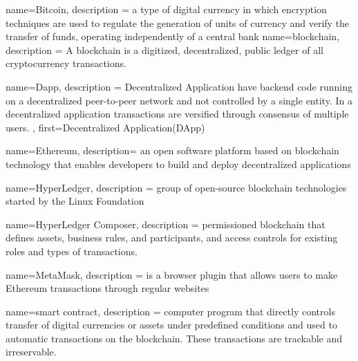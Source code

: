 {
	name={Bitcoin},
	description ={
		a type of digital currency in which encryption techniques are used to regulate the generation of units of currency and verify the transfer of funds, operating independently of a central bank
	}
}
{
	name={blockchain},
	description ={
		A blockchain is a digitized, decentralized, public ledger of all cryptocurrency transactions. 
	}
}


{
	name={Dapp},
	description ={
		Decentralized Application have backend code running on a decentralized peer-to-peer network and not controlled by a single entity. In a decentralized application transactions are versified through consensus of multiple users.
	},
	first={Decentralized Application(DApp)}
}


{
	name={Ethereum},
	description={
		an open software platform based on blockchain technology that enables developers to build and deploy decentralized applications
	}
}

{
	name={HyperLedger},
	description ={
		group of open-source blockchain technologies started by the Linux Foundation
	}
}

{
	name={HyperLedger Composer},
	description ={
		permissioned blockchain that defines assets, business rules, and participants, and access controls for existing roles and types of transactions.
	}
}

{
	name={MetaMask},
	description ={
		is a browser plugin that allows users to make Ethereum transactions through regular websites
	}
}



{
	name={smart contract},
	description ={
		computer program that directly controls transfer of digital currencies or assets under predefined conditions and used to automatic transactions on the blockchain. These transactions are trackable and irreservable.
	}
}

